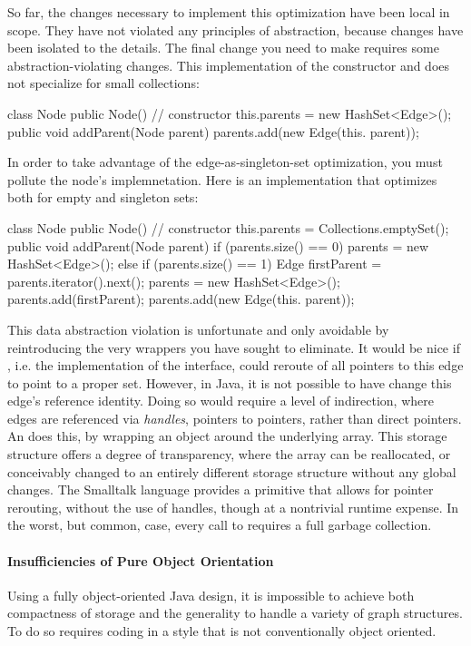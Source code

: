 So far, the changes necessary to implement this optimization have been local in
scope. They have not violated any principles of abstraction, because changes have
been isolated to the  details. The final change you need to make
requires some abstraction-violating changes. This implementation of the
constructor and  does not specialize for small collections:

\begin{shortlisting}
class Node {
  public Node() { // constructor
     this.parents = new HashSet<Edge>();
  }
  public void addParent(Node parent) {
     parents.add(new Edge(this. parent));
  }
}
\end{shortlisting} 

In order to take advantage of the edge-as-singleton-set optimization, you must
pollute the node's  implemnetation. Here is an implementation
that optimizes both for empty and singleton sets:

\begin{shortlisting}
class Node {
  public Node() { // constructor
     this.parents = Collections.emptySet();
  }
  public void addParent(Node parent) {
     if (parents.size() == 0) parents = new HashSet<Edge>();
     else if (parents.size() == 1) {
        Edge firstParent = parents.iterator().next();
        parents = new HashSet<Edge>();
        parents.add(firstParent);
     }
     parents.add(new Edge(this. parent));
  }
}
\end{shortlisting} 

This data abstraction violation is unfortunate and only avoidable by
reintroducing the very wrappers you have sought to eliminate. It would be nice if
, i.e. the implementation of the  interface, could
reroute of all pointers to this edge to point to a proper set. However, in Java,
it is not possible to have  change this edge's reference
identity. Doing so would require a level of indirection, where edges are
referenced via \emph{handles}, pointers to pointers, rather than direct
pointers. An  does this, by wrapping an object
around the underlying array. This storage structure offers a degree of
transparency, where the array can be reallocated, or conceivably changed to an
entirely different storage structure without any global changes. The Smalltalk
language provides a 
primitive that allows for pointer rerouting,
without the use of handles, though at a nontrivial runtime expense. In the worst,
but common, case, every call to  requires a full garbage collection.

\paragraph{Insufficiencies of Pure Object Orientation}
Using a fully object-oriented Java design, it is impossible to achieve both
compactness of storage and the generality to handle a variety of graph
structures. To do so requires coding in a style that is not conventionally object
oriented.

